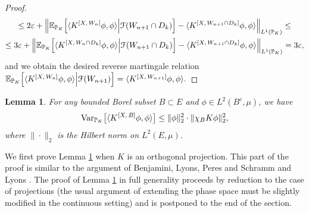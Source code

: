 \documentclass[12pt]{paper}
\newtheorem{lemma}[theorem]{Lemma}
\numberwithin{theorem}{section}
\numberwithin{figure}{section}
\numberwithin{equation}{section}
\begin{document}
\begin{proof}
\begin{multline}
\le  2 \varepsilon +  \left\|  \mathbb{E}_{\mathbb{P}_K} \Big[ \langle  K^{[X, \, W_n]} \phi, \phi\rangle  \Big| \mathcal{F}(W_{n+1} \cap D_k)\Big]  -  \langle  K^{[X, \, W_{n+1} \cap D_k]} \phi, \phi\rangle\right\|_{L^1(\mathbb{P}_K)}
\le \\ \le 3 \varepsilon +  \left\|  \mathbb{E}_{\mathbb{P}_K} \Big[ \langle  K^{[X, \, W_n \cap D_k]} \phi, \phi\rangle  \Big| \mathcal{F}(W_{n+1} \cap D_k)\Big]  -  \langle  K^{[X, \, W_{n+1} \cap D_k]} \phi, \phi\rangle\right\|_{L^1( \mathbb{P}_K)} =3 \varepsilon,
\end{multline}
and we obtain the desired reverse martingale relation
$
\mathbb{E}_{\mathbb{P}_K} \Big[ \langle  K^{[X, \, W_n]} \phi, \phi\rangle  \Big| \mathcal{F}(W_{n+1})\Big] =  \langle  K^{[X, \, W_{n+1}]} \phi, \phi\rangle.
$
\end{proof}



\begin{lemma}\label{lem-var}
For any bounded Borel subset $B\subset E$ and $\phi \in L^2(B^c, \mu)$, we have
\begin{align}\label{cont-var}
\mathrm{Var}_{\mathbb{P}_K} \big[\langle K^{[X, \, B]} \phi, \phi \rangle \big] \le   \| \phi\|_2^2\cdot  \|\chi_{B}  K \phi \|_2^2,
\end{align}
where $\| \cdot\|_2$ is the Hilbert norm on $L^2(E, \mu)$.
\end{lemma}

We first prove Lemma \ref{lem-var}  when $K$ is an orthogonal projection. This part of the proof is similar to the argument of Benjamini, Lyons, Peres and Schramm
\cite[Lemma 8.6]{BLPS} and Lyons \cite[Lemma 7.18]{DPP-L}.  The  proof of  Lemma \ref{lem-var} in full generality proceeds by reduction to the case of projections (the usual argument of extending the phase space must be slightly modified
  in the continuous setting) and is postponed to the end of the section.
\end{document}
